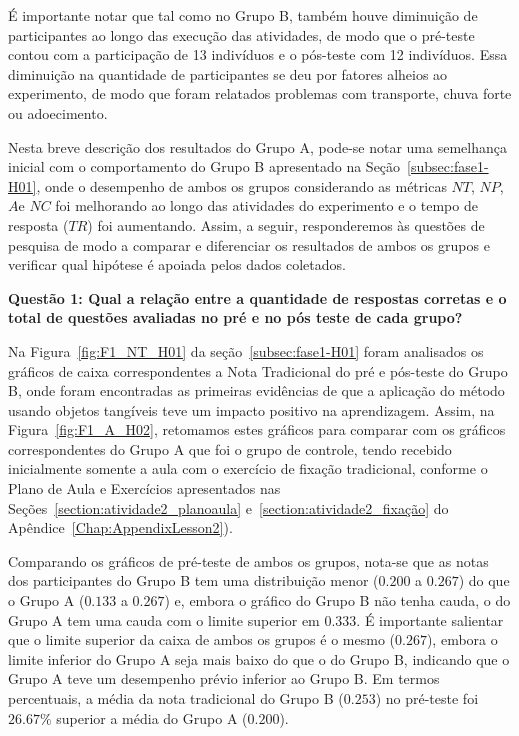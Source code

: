 É importante notar que tal como no Grupo B, também houve diminuição de participantes ao longo das execução das atividades, de modo que o pré-teste contou com a participação de 13 indivíduos e o pós-teste com 12 indivíduos. Essa diminuição na quantidade de participantes se deu por fatores alheios ao experimento, de modo que foram relatados problemas com transporte, chuva forte ou adoecimento.

Nesta breve descrição dos resultados do Grupo A, pode-se notar uma semelhança inicial com o comportamento do Grupo B apresentado na Seção~\ref{subsec:fase1-H01}, onde o desempenho de ambos os grupos considerando as métricas $NT$, $NP$, $A $e $NC$ foi melhorando ao longo das atividades do experimento e o tempo de resposta ($TR$) foi aumentando. Assim, a seguir, responderemos às questões de pesquisa de modo a comparar e diferenciar os resultados de ambos os grupos e verificar qual hipótese é apoiada pelos dados coletados.

\textbf{Questão 1: Qual a relação entre a quantidade de respostas corretas e o total de questões avaliadas no pré e no pós teste de cada grupo?}

Na Figura~\ref{fig:F1_NT_H01} da seção~\ref{subsec:fase1-H01} foram analisados os gráficos de caixa correspondentes a Nota Tradicional do pré e pós-teste do Grupo B, onde foram encontradas as primeiras evidências de que a aplicação do método usando objetos tangíveis teve um impacto positivo na aprendizagem. Assim, na Figura~\ref{fig:F1_A_H02}, retomamos estes gráficos para comparar com os gráficos correspondentes do Grupo A que foi o grupo de controle, tendo recebido inicialmente somente a aula com o exercício de fixação tradicional, conforme o Plano de Aula e Exercícios apresentados nas Seções~\ref{section:atividade2_planoaula} e~\ref{section:atividade2_fixação} do Apêndice~\ref{Chap:AppendixLesson2}).

Comparando os gráficos de pré-teste de ambos os grupos, nota-se que as notas dos participantes do Grupo B tem uma distribuição menor ($0.200$ a $0.267$) do que o Grupo A ($0.133$ a $0.267$) e, embora o gráfico do Grupo B não tenha cauda, o do Grupo A tem uma cauda com o limite superior em $0.333$. É importante salientar que o limite superior da caixa de ambos os grupos é o mesmo ($0.267$), embora o limite inferior do Grupo A seja mais baixo do que o do Grupo B, indicando que o Grupo A teve um desempenho prévio inferior ao Grupo B. Em termos percentuais, a média da nota tradicional do Grupo B ($0.253$) no pré-teste foi $26.67\%$ superior a média do Grupo A ($0.200$).

